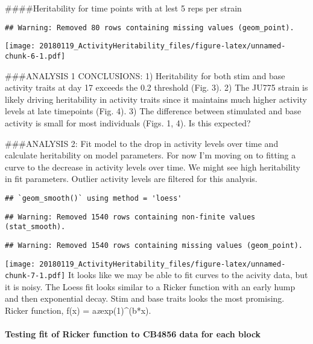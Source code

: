 \documentclass[]{article}
\let\oldparagraph\paragraph
\renewcommand{\paragraph}[1]{\oldparagraph{#1}\mbox{}}
\begin{document}
\#\#\#\#Heritability for time points with at lest 5 reps per strain

\begin{verbatim}
## Warning: Removed 80 rows containing missing values (geom_point).
\end{verbatim}

\texttt{[image: 20180119\_ActivityHeritability\_files/figure-latex/unnamed-chunk-6-1.pdf]}

\#\#\#ANALYSIS 1 CONCLUSIONS: 1) Heritability for both stim and base
activity traits at day 17 exceeds the 0.2 threshold (Fig. 3). 2) The
JU775 strain is likely driving heritability in activity traits since it
maintains much higher activity levels at late timepoints (Fig. 4). 3)
The difference between stimulated and base activity is small for most
individuals (Figs. 1, 4). Is this expected?

\#\#\#ANALYSIS 2: Fit model to the drop in activity levels over time and
calculate heritability on model parameters. For now I'm moving on to
fitting a curve to the decrease in activity levels over time. We might
see high heritability in fit parameters. Outlier activity levels are
filtered for this analysis.

\begin{verbatim}
## `geom_smooth()` using method = 'loess'
\end{verbatim}

\begin{verbatim}
## Warning: Removed 1540 rows containing non-finite values (stat_smooth).
\end{verbatim}

\begin{verbatim}
## Warning: Removed 1540 rows containing missing values (geom_point).
\end{verbatim}

\texttt{[image: 20180119\_ActivityHeritability\_files/figure-latex/unnamed-chunk-7-1.pdf]}
It looks like we may be able to fit curves to the acivity data, but it
is noisy. The Loess fit looks similar to a Ricker function with an early
hump and then exponential decay. Stim and base traits looks the most
promising. Ricker function, f(x) = a\emph{x}exp(1)\^{}(b*x).

\hypertarget{testing-fit-of-ricker-function-to-cb4856-data-for-each-block}{%
\paragraph{Testing fit of Ricker function to CB4856 data for each
block}\label{testing-fit-of-ricker-function-to-cb4856-data-for-each-block}}
\end{document}
